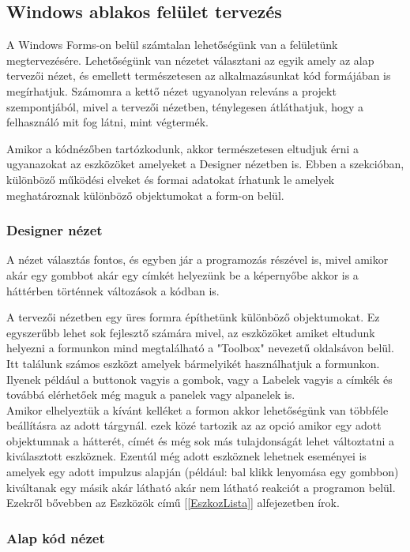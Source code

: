 \documentclass[tocnopagenum]{thesis-ekf}
\theoremstyle{definition}
\theoremstyle{remark}
\begin{document}
	\subsection{Windows ablakos felület tervezés}
	A Windows Forms-on belül számtalan lehetőségünk van a felületünk  megtervezésére. Lehetőségünk van nézetet választani az egyik amely az alap tervezői nézet, és emellett természetesen az alkalmazásunkat kód formájában is megírhatjuk. Számomra a kettő nézet ugyanolyan releváns a projekt szempontjából, mivel a tervezői nézetben, ténylegesen átláthatjuk, hogy a felhasználó mit fog látni, mint végtermék.
	
	Amikor a kódnézőben tartózkodunk, akkor természetesen eltudjuk érni a ugyanazokat az eszközöket amelyeket a Designer nézetben is.
	Ebben a szekcióban, különböző működési elveket és formai adatokat írhatunk le amelyek meghatároznak különböző objektumokat a form-on belül. \cite{appSysWinform}
	\subsubsection{Designer nézet}
	A nézet választás fontos, és egyben jár a programozás részével is, mivel amikor akár egy gombbot akár egy címkét helyezünk be a képernyőbe akkor is a háttérben történnek változások a kódban is.
	
	A tervezői nézetben egy üres formra építhetünk különböző objektumokat.
	Ez egyszerűbb lehet sok fejlesztő számára mivel, az eszközöket amiket eltudunk helyezni a formunkon mind megtalálható a "Toolbox" nevezetű oldalsávon belül.
	\\
	Itt találunk számos eszközt amelyek bármelyikét használhatjuk a formunkon. Ilyenek például a buttonok vagyis a gombok, vagy a Labelek vagyis a címkék és továbbá elérhetőek még maguk a panelek vagy alpanelek is. 
	\\
	Amikor elhelyeztük a kívánt kelléket a formon akkor lehetőségünk van többféle beállításra az adott tárgynál. ezek közé tartozik az az opció amikor egy adott objektumnak a hátterét, címét és még sok más tulajdonságát lehet változtatni a kiválasztott eszköznek. Ezentúl még adott eszköznek lehetnek eseményei is amelyek egy adott impulzus alapján (például: bal klikk lenyomása egy gombbon) kiváltanak egy másik akár látható akár nem látható reakciót a programon belül. Ezekről bővebben az Eszközök című [\ref{EszkozLista}] alfejezetben írok.
	
	\subsubsection{Alap kód nézet}
	
\end{document}
